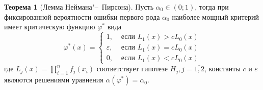 \documentclass[oneside,final,14pt]{extreport}
\theoremstyle{plain}
\theoremstyle{definition}
\theoremstyle{named}
\newtheorem*{namedthm}{Теорема}
\begin{document}
\begin{namedthm}[Лемма Неймана"--~Пирсона]
Пусть $\alpha_{0} \in(0;1)$, тогда при фиксированной вероятности ошибки первого рода $\alpha_{0}$ наиболее мощный критерий имеет критическую функцию $\varphi^{*}$ вида
\begin{equation*}
    \varphi^{*}(x)=\left\{\begin{array}{ll}
    1, & \text { если } L_{1}(x)>c L_{0}(x) \\
    \varepsilon, & \text { если } L_{1}(x)=c L_{0}(x) \\
    0, & \text { если } L_{1}(x)<c L_{0}(x)
    \end{array}\right.
\end{equation*}
где $L_{j}(x)=\prod_{i=1}^{n} f_{j}\left(x_{i}\right)$ соответствует гипотезе $H_j, j = \overline{1,2}$, константы $c$ и $\varepsilon$ являются решениями уравнения $\alpha\left(\varphi^{*}\right)=\alpha_{0}$.
\end{namedthm}
\end{document}
